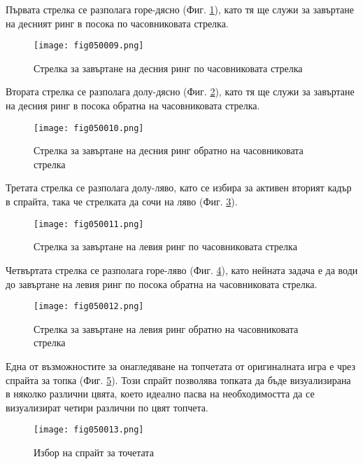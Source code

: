 Първата стрелка се разполага горе-дясно (Фиг. \ref{fig050009}), като тя ще служи за завъртане на десният ринг в посока по часовниковата стрелка.

\begin{figure}[H]
  \centering
  \texttt{[image: fig050009.png]}
  \caption{Стрелка за завъртане на десния ринг по часовниковата стрелка}
\label{fig050009}
\end{figure}

Втората стрелка се разполага долу-дясно (Фиг. \ref{fig050010}), като тя ще служи за завъртане на десния ринг в посока обратна на часовниковата стрелка.

\begin{figure}[H]
  \centering
  \texttt{[image: fig050010.png]}
  \caption{Стрелка за завъртане на десния ринг обратно на часовниковата стрелка}
\label{fig050010}
\end{figure}

Третата стрелка се разполага долу-ляво, като се избира за активен вторият кадър в спрайта, така че стрелката да сочи на ляво (Фиг. \ref{fig050011}).

\begin{figure}[H]
  \centering
  \texttt{[image: fig050011.png]}
  \caption{Стрелка за завъртане на левия ринг по часовниковата стрелка}
\label{fig050011}
\end{figure}

Четвъртата стрелка се разполага горе-ляво (Фиг. \ref{fig050012}), като нейната задача е да води до завъртане на левия ринг по посока обратна на часовниковата стрелка.

\begin{figure}[H]
  \centering
  \texttt{[image: fig050012.png]}
  \caption{Стрелка за завъртане на левия ринг обратно на часовниковата стрелка}
\label{fig050012}
\end{figure}

Една от възможностите за онагледяване на топчетата от оригиналната игра е чрез спрайта за топка (Фиг. \ref{fig050013}). Този спрайт позволява топката да бъде визуализирана в няколко различни цвята, което идеално пасва на необходимостта да се визуализират четири различни по цвят топчета.

\begin{figure}[H]
  \centering
  \texttt{[image: fig050013.png]}
  \caption{Избор на спрайт за точетата}
\label{fig050013}
\end{figure}

